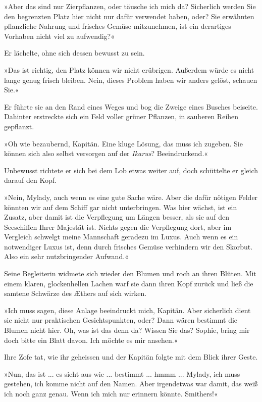»Aber das sind nur Zierpflanzen, oder täusche ich mich da?
Sicherlich werden Sie den begrenzten Platz hier nicht nur dafür
verwendet haben, oder? Sie erwähnten pflanzliche Nahrung und
frisches Gemüse mitzunehmen, ist ein derartiges Vorhaben nicht viel
zu aufwendig?«

Er lächelte, ohne sich dessen bewusst zu sein.

»Das ist richtig, den Platz können wir nicht erübrigen. Außerdem
würde es nicht lange genug frisch bleiben. Nein, dieses Problem
haben wir anders gelöst, schauen Sie.«

Er führte sie an den Rand eines Weges und bog die Zweige eines
Busches beiseite. Dahinter erstreckte sich ein Feld voller grüner
Pflanzen, in sauberen Reihen gepflanzt.

»Oh wie bezaubernd, Kapitän. Eine kluge Lösung, das muss ich
zugeben. Sie können sich also selbst versorgen auf der
\emph{Ikarus}? Beeindruckend.«

Unbewusst richtete er sich bei dem Lob etwas weiter auf, doch
schüttelte er gleich darauf den Kopf.

»Nein, Mylady, auch wenn es eine gute Sache wäre. Aber die dafür
nötigen Felder könnten wir auf dem Schiff gar nicht unterbringen.
Was hier wächst, ist ein Zusatz, aber damit ist die Verpflegung um
Längen besser, als sie auf den Seeschiffen Ihrer Majestät ist.
Nichts gegen die Verpflegung dort, aber im Vergleich schwelgt meine
Mannschaft geradezu im Luxus. Auch wenn es ein notwendiger Luxus
ist, denn durch frisches Gemüse verhindern wir den Skorbut. Also
ein sehr nutzbringender Aufwand.«

Seine Begleiterin widmete sich wieder den Blumen und roch an ihren
Blüten. Mit einem klaren, glockenhellen Lachen warf sie dann ihren
Kopf zurück und ließ die samtene Schwärze des Æthers auf sich
wirken.

»Ich muss sagen, diese Anlage beeindruckt mich, Kapitän. Aber
sicherlich dient sie nicht nur praktischen Gesichtspunkten, oder?
Dann wären bestimmt die Blumen nicht hier. Oh, was ist das denn da?
Wissen Sie das? Sophie, bring mir doch bitte ein Blatt davon. Ich
möchte es mir ansehen.«

Ihre Zofe tat, wie ihr geheissen und der Kapitän folgte mit dem
Blick ihrer Geste.

»Nun, das ist ... es sieht aus wie ... bestimmt ... hmmm ...
Mylady, ich muss gestehen, ich komme nicht auf den Namen. Aber
irgendetwas war damit, das weiß ich noch ganz genau. Wenn ich mich
nur erinnern könnte. Smithers!«

